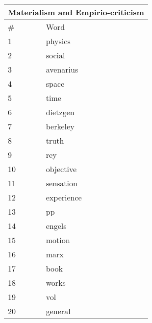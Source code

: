 \documentclass{pnastwo}
\begin{document}
\begin{article}
\begin{center}
  \begin{tabular}{ | l | l | }
    \hline
\multicolumn{2}{|c|}{Materialism and Empirio-criticism} \\ \hline
\# & Word  \\ \hline
1 & physics \\ \hline
2 & social \\ \hline
3 & avenarius \\ \hline
4 & space \\ \hline
5 & time \\ \hline
6 & dietzgen \\ \hline
7 & berkeley \\ \hline
8 & truth \\ \hline
9 & rey \\ \hline
10 & objective \\ \hline
11 & sensation \\ \hline
12 & experience \\ \hline
13 & pp \\ \hline
14 & engels \\ \hline
15 & motion \\ \hline
16 & marx \\ \hline
17 & book \\ \hline
18 & works \\ \hline
19 & vol \\ \hline
20 & general \\ \hline
  \end{tabular}
\end{center}


\end{article}
\end{document}
